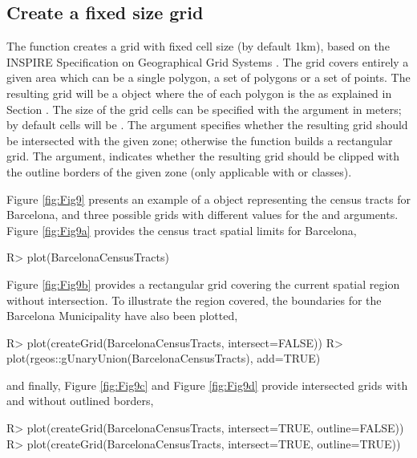 \subsection{Create a fixed size grid } \label{sec:grid}

The  function creates a grid with fixed cell size (by default 1km), based on the INSPIRE Specification on Geographical Grid Systems \citep{INSPIRE2010}. The grid covers entirely a given area which can be a single polygon, a set of polygons or a set of points. The resulting grid will be a  object where the  of each polygon is the  as explained in Section . The size of the grid cells can be specified with the  argument in meters; by default cells will be . The  argument specifies whether the resulting grid should be intersected with the given zone; otherwise the function builds a rectangular grid. The  argument, indicates whether the resulting grid should be clipped with the outline borders of the given zone (only applicable with  or  classes).

Figure \ref{fig:Fig9} presents an example of a  object representing the census tracts for Barcelona, and three possible grids with different values for the  and  arguments. Figure \ref{fig:Fig9a} provides the census tract spatial limits for Barcelona,
%
\begin{example*}
R> plot(BarcelonaCensusTracts)
\end{example*}
%
Figure \ref{fig:Fig9b} provides a rectangular grid covering the current spatial region without intersection. To illustrate the region covered, the boundaries for the Barcelona Municipality have also been plotted,
%
\begin{example*}
R> plot(createGrid(BarcelonaCensusTracts, intersect=FALSE))
R> plot(rgeos::gUnaryUnion(BarcelonaCensusTracts), add=TRUE)
\end{example*}
%
and finally, Figure \ref{fig:Fig9c} and Figure \ref{fig:Fig9d} provide intersected grids with and without outlined borders,
%
\begin{example*}
R> plot(createGrid(BarcelonaCensusTracts, intersect=TRUE, outline=FALSE))
R> plot(createGrid(BarcelonaCensusTracts, intersect=TRUE, outline=TRUE))
\end{example*}
%

